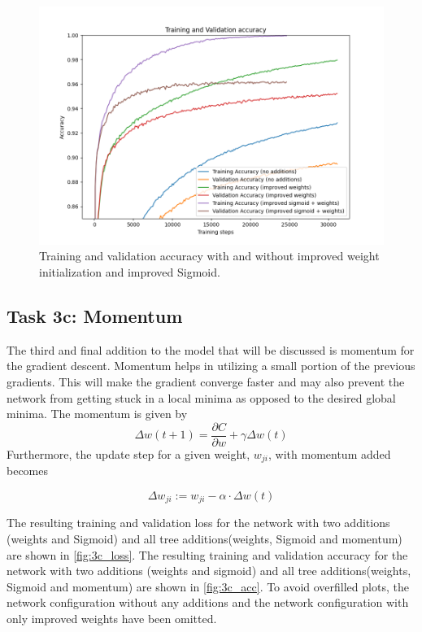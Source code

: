 \documentclass{article}
\begin{document}
\begin{figure}[H]
    \centering
    \includegraphics[width=\textwidth]{Assignments/Assignment_2/plots/task3/3b_accuracy.png}
    \caption{Training and validation accuracy with and without improved weight initialization and improved Sigmoid.}
    \label{fig:3b_acc}
\end{figure}


\subsection{Task 3c: Momentum}
The third and final addition to the model that will be discussed is momentum for the gradient descent. Momentum helps in utilizing a small portion of the previous gradients. This will make the gradient converge faster and may also prevent the network from getting stuck in a local minima as opposed to the desired global minima. The momentum is given by
\begin{equation}
    \Delta w (t + 1) =  \frac{\partial C}{\partial w} + \gamma \Delta w(t)
    \label{eq:momentum}
\end{equation}
 Furthermore, the update step for a given weight, $w_{ji}$, with momentum added becomes 

\begin{equation}
    \Delta w_{ji} :=  w_{ji} - \alpha \cdot \Delta w(t)
    \label{eq:momentum-grad}
\end{equation}


The resulting training and validation loss for the network with two additions (weights and Sigmoid) and all tree additions(weights, Sigmoid and momentum) are shown in \autoref{fig:3c_loss}. The resulting training and validation accuracy for the network with two additions (weights and sigmoid) and all tree additions(weights, Sigmoid and momentum) are shown in \autoref{fig:3c_acc}. To avoid overfilled plots, the network configuration without any additions and the network configuration with only improved weights have been omitted.
\end{document}
